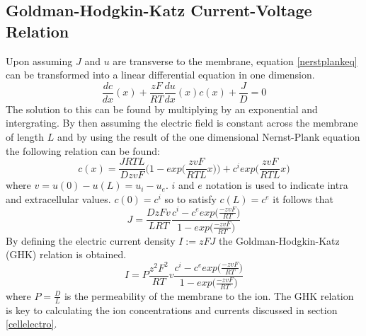 \subsection{Goldman-Hodgkin-Katz Current-Voltage Relation}
\label{appendixGHK}
Upon assuming $J$ and $u$ are transverse to the membrane, equation \ref{nerstplankeq} can be transformed into a linear differential equation in one dimension. 
\begin{equation}
    \frac{dc}{dx}(x)+\frac{zF}{RT}\frac{du}{dx}(x)c(x)+\frac{J}{D} = 0
\end{equation}
The solution to this can be found by multiplying by an exponential and intergrating. By then assuming the electric field is constant across the membrane of length $L$ and by using the result of the one dimensional Nernst-Plank equation the following relation can be found:
\begin{equation}
    c(x) = \frac{JRTL}{DzvF}\bigg(1-exp\bigg(\frac{zvF}{RTL}x\bigg)\bigg)+c^iexp\bigg(\frac{zvF}{RTL}x\bigg)
\end{equation}
where $v = u(0)-u(L) = u_i-u_e$. $i$ and $e$ notation is used to indicate intra and extracellular values. $c(0) = c^i$ so to satisfy $c(L) = c^e$ it follows that 
\begin{equation}
    J = \frac{DzFv}{LRT}\frac{c^i-c^eexp\big(\frac{-zvF}{RT}\big)}{1-exp\big(\frac{-zvF}{RT}\big)}
\end{equation}
By defining the electric current density $I := zFJ$ the Goldman-Hodgkin-Katz (GHK) relation is obtained.
\begin{equation}
    I=P\frac{z^2F^2}{RT}v\frac{c^i-c^eexp\big(\frac{-zvF}{RT}\big)}{1-exp\big(\frac{-zvF}{RT}\big)}
\end{equation}
where $P = \frac{D}{L}$ is the permeability of the membrane to the ion. The GHK relation is key to calculating the ion concentrations and currents discussed in section \ref{cellelectro}.

